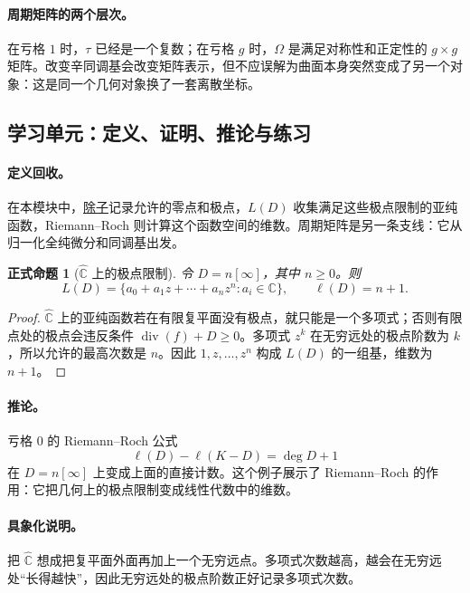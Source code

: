 \documentclass[UTF8,fontset=none,a4paper,11pt]{ctexart}
\theoremstyle{foundation-definition}
\theoremstyle{foundation-theorem}
\theoremstyle{foundation-proposition}
\newtheorem{proposition}[definition]{正式命题}
\theoremstyle{foundation-example}
\theoremstyle{foundation-remark}
\theoremstyle{foundation-theorem}
\newcommand{\term}[2]{\hyperref[#1]{#2}}
\begin{document}
\paragraph{周期矩阵的两个层次。}
在亏格 \(1\) 时，\(\tau\) 已经是一个复数；在亏格 \(g\) 时，\(\Omega\) 是满足对称性和正定性的 \(g\times g\) 矩阵。改变辛同调基会改变矩阵表示，但不应误解为曲面本身突然变成了另一个对象：这是同一个几何对象换了一套离散坐标。

\subsection{学习单元：定义、证明、推论与练习}

\paragraph{定义回收。}
在本模块中，\term{def:divisor}{除子}记录允许的零点和极点，\(L(D)\) 收集满足这些极点限制的亚纯函数，Riemann--Roch 则计算这个函数空间的维数。周期矩阵是另一条支线：它从归一化全纯微分和同调基出发。

\begin{proposition}[\(\widehat{\mathbb C}\) 上的极点限制]\label{prop:p1-divisor-space}
令 \(D=n[\infty]\)，其中 \(n\geq0\)。则
\[
L(D)=\{a_0+a_1z+\cdots+a_nz^n:a_i\in\mathbb C\},
\qquad
\ell(D)=n+1.
\]
\end{proposition}

\begin{proof}
\(\widehat{\mathbb C}\) 上的亚纯函数若在有限复平面没有极点，就只能是一个多项式；否则有限点处的极点会违反条件 \(\operatorname{div}(f)+D\geq0\)。多项式 \(z^k\) 在无穷远处的极点阶数为 \(k\)，所以允许的最高次数是 \(n\)。因此 \(1,z,\dots,z^n\) 构成 \(L(D)\) 的一组基，维数为 \(n+1\)。
\end{proof}

\paragraph{推论。}
亏格 \(0\) 的 Riemann--Roch 公式
\[
\ell(D)-\ell(K-D)=\deg D+1
\]
在 \(D=n[\infty]\) 上变成上面的直接计数。这个例子展示了 Riemann--Roch 的作用：它把几何上的极点限制变成线性代数中的维数。

\paragraph{具象化说明。}
把 \(\widehat{\mathbb C}\) 想成把复平面外面再加上一个无穷远点。多项式次数越高，越会在无穷远处“长得越快”，因此无穷远处的极点阶数正好记录多项式次数。
\end{document}
